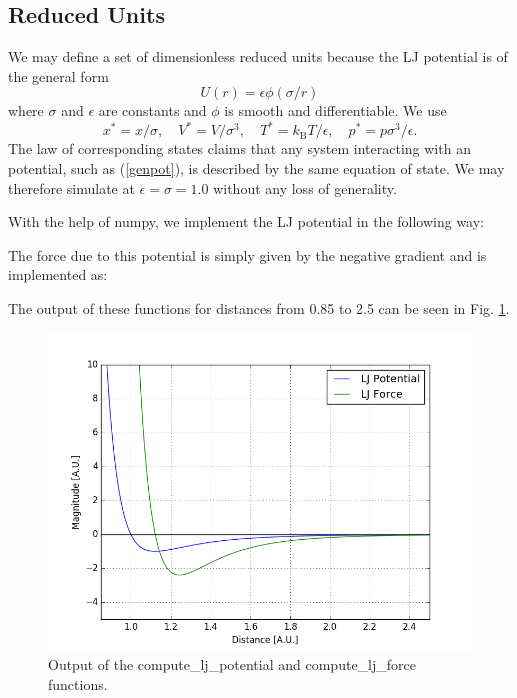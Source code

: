 \documentclass[11pt,a4paper]{scrartcl}
\newcommand{\eref}[1]{(\ref{#1})}						%
\newcommand{\listfile}[7][MyPythonStyle]{
}
\begin{document}
\subsection{Reduced Units}
We may define a set of dimensionless reduced units because the LJ potential is of the general form
\begin{equation}\label{genpot}
U(r) = \epsilon \phi(\sigma/r)
\end{equation}
where $\sigma$ and $\epsilon$ are constants and $\phi$ is smooth and differentiable. We use
\begin{equation}
x^* = x/\sigma,\quad V^* = V/\sigma^3, \quad T^* = k_\mathrm{B} T/\epsilon,\quad p^* = p\sigma^3/\epsilon.
\end{equation}
The law of corresponding states claims that any system interacting with an potential, such as \eref{genpot}, is described by the same equation of state. We may therefore simulate at $\epsilon = \sigma = 1.0$ without any loss of generality.

With the help of numpy, we implement the LJ potential in the following way:
\listfile{../src/ljlib.py}{ljlib.py}{10}{13}{LJ Potential}{ljpotential}
The force due to this potential is simply given by the negative gradient and is implemented as:
\listfile{../src/ljlib.py}{ljlib.py}{15}{19}{LJ Force}{ljforce}
The output of these functions for distances from 0.85 to 2.5 can be seen in Fig. \ref{fig:lj}.
\begin{figure}[h]
\includegraphics[width=0.7\linewidth]{../fig/ljplot.png}
  \centering
  \caption{Output of the compute\_lj\_potential and compute\_lj\_force functions.}
\label{fig:lj}
\end{figure}
\end{document}
